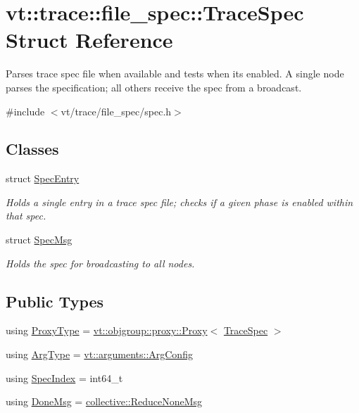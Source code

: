 \hypertarget{structvt_1_1trace_1_1file__spec_1_1_trace_spec}{}\section{vt\+:\+:trace\+:\+:file\+\_\+spec\+:\+:Trace\+Spec Struct Reference}
\label{structvt_1_1trace_1_1file__spec_1_1_trace_spec}


Parses trace spec file when available and tests when its enabled. A single node parses the specification; all others receive the spec from a broadcast.  




{\ttfamily \#include $<$vt/trace/file\+\_\+spec/spec.\+h$>$}

\subsection*{Classes}
\begin{DoxyCompactItemize}
\item 
struct \hyperlink{structvt_1_1trace_1_1file__spec_1_1_trace_spec_1_1_spec_entry}{Spec\+Entry}
\begin{DoxyCompactList}\small\item\em Holds a single entry in a trace spec file; checks if a given phase is enabled within that spec. \end{DoxyCompactList}\item 
struct \hyperlink{structvt_1_1trace_1_1file__spec_1_1_trace_spec_1_1_spec_msg}{Spec\+Msg}
\begin{DoxyCompactList}\small\item\em Holds the spec for broadcasting to all nodes. \end{DoxyCompactList}\end{DoxyCompactItemize}
\subsection*{Public Types}
\begin{DoxyCompactItemize}
\item 
using \hyperlink{structvt_1_1trace_1_1file__spec_1_1_trace_spec_a26160cff9bb5115866943ed823405f1f}{Proxy\+Type} = \hyperlink{structvt_1_1objgroup_1_1proxy_1_1_proxy}{vt\+::objgroup\+::proxy\+::\+Proxy}$<$ \hyperlink{structvt_1_1trace_1_1file__spec_1_1_trace_spec}{Trace\+Spec} $>$
\item 
using \hyperlink{structvt_1_1trace_1_1file__spec_1_1_trace_spec_a273c85ad6266102f3cf20f72a739fd95}{Arg\+Type} = \hyperlink{structvt_1_1arguments_1_1_arg_config}{vt\+::arguments\+::\+Arg\+Config}
\item 
using \hyperlink{structvt_1_1trace_1_1file__spec_1_1_trace_spec_a4dd2e8fb971930351812d0f286baece2}{Spec\+Index} = int64\+\_\+t
\item 
using \hyperlink{structvt_1_1trace_1_1file__spec_1_1_trace_spec_a31fc42c00ddc382be9c198459793e1e9}{Done\+Msg} = \hyperlink{namespacevt_1_1collective_aa439a90f05078f2bcf918641c951946f}{collective\+::\+Reduce\+None\+Msg}
\end{DoxyCompactItemize}
